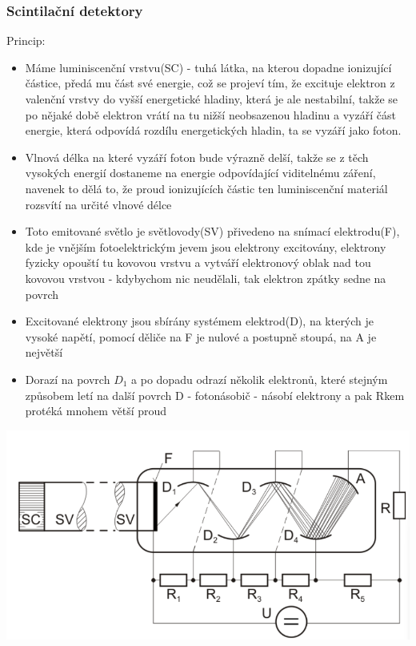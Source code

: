 \subsubsection*{Scintilační detektory}
Princip:
\begin{itemize}
    \item Máme luminiscenční vrstvu(SC) - tuhá látka, na kterou dopadne ionizující částice, předá mu část své energie, což se projeví tím, že excituje elektron z valenční vrstvy do vyšší energetické hladiny, která je ale nestabilní, takže se po nějaké době elektron vrátí na tu nižší neobsazenou hladinu a vyzáří část energie, která odpovídá rozdílu energetických hladin, ta se vyzáří jako foton.
    \item Vlnová délka na které vyzáří foton bude výrazně delší, takže se z těch vysokých energií dostaneme na energie odpovídající viditelnému záření, navenek to dělá to, že proud ionizujících částic ten luminiscenční materiál rozsvítí na určité vlnové délce
    \item Toto emitované světlo je světlovody(SV) přivedeno na snímací elektrodu(F), kde je vnějším fotoelektrickým jevem jsou elektrony excitovány, elektrony fyzicky opouští tu kovovou vrstvu a vytváří elektronový oblak nad tou kovovou vrstvou - kdybychom nic neudělali, tak elektron zpátky sedne na povrch
    \item Excitované elektrony jsou sbírány systémem elektrod(D), na kterých je vysoké napětí, pomocí děliče na F je nulové a postupně stoupá, na A je největší
    \item Dorazí na povrch $D_1$ a po dopadu odrazí několik elektronů, které stejným způsobem letí na další povrch D - fotonásobič - násobí elektrony a pak Rkem protéká mnohem větší proud
\end{itemize}

\includegraphics*[scale = 0.4]{img/scitilacni.png}



